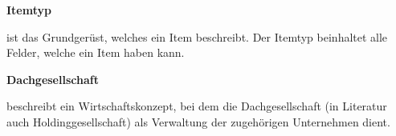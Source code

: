 \documentclass[11pt,a4paper]{report}
\begin{document}
\textbf{Itemtyp}
\par
\begingroup
\leftskip=1cm
\noindent ist das Grundgerüst, welches ein Item beschreibt. 
Der Itemtyp beinhaltet alle Felder, welche ein Item haben kann.\\
\par
\endgroup

\textbf{Dachgesellschaft}
\par
\begingroup
\leftskip=1cm
\noindent beschreibt ein Wirtschaftskonzept, bei dem die Dachgesellschaft (in Literatur auch Holdinggesellschaft) als Verwaltung der zugehörigen Unternehmen dient.\\
\par
\endgroup
\end{document}
